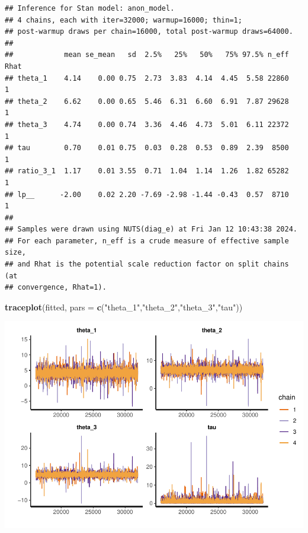 \documentclass[
]{article}
\newenvironment{Shaded}{\begin{snugshade}}{\end{snugshade}}
\newcommand{\AttributeTok}[1]{\textcolor[rgb]{0.13,0.29,0.53}{#1}}
\newcommand{\FunctionTok}[1]{\textcolor[rgb]{0.13,0.29,0.53}{\textbf{#1}}}
\newcommand{\NormalTok}[1]{#1}
\newcommand{\StringTok}[1]{\textcolor[rgb]{0.31,0.60,0.02}{#1}}
\begin{document}
\begin{verbatim}
## Inference for Stan model: anon_model.
## 4 chains, each with iter=32000; warmup=16000; thin=1; 
## post-warmup draws per chain=16000, total post-warmup draws=64000.
## 
##            mean se_mean   sd  2.5%   25%   50%   75% 97.5% n_eff Rhat
## theta_1    4.14    0.00 0.75  2.73  3.83  4.14  4.45  5.58 22860    1
## theta_2    6.62    0.00 0.65  5.46  6.31  6.60  6.91  7.87 29628    1
## theta_3    4.74    0.00 0.74  3.36  4.46  4.73  5.01  6.11 22372    1
## tau        0.70    0.01 0.75  0.03  0.28  0.53  0.89  2.39  8500    1
## ratio_3_1  1.17    0.01 3.55  0.71  1.04  1.14  1.26  1.82 65282    1
## lp__      -2.00    0.02 2.20 -7.69 -2.98 -1.44 -0.43  0.57  8710    1
## 
## Samples were drawn using NUTS(diag_e) at Fri Jan 12 10:43:38 2024.
## For each parameter, n_eff is a crude measure of effective sample size,
## and Rhat is the potential scale reduction factor on split chains (at 
## convergence, Rhat=1).
\end{verbatim}

\begin{Shaded}
\begin{Highlighting}[]
\FunctionTok{traceplot}\NormalTok{(fitted, }\AttributeTok{pars =} \FunctionTok{c}\NormalTok{(}\StringTok{"theta\_1"}\NormalTok{,}\StringTok{"theta\_2"}\NormalTok{,}\StringTok{"theta\_3"}\NormalTok{,}\StringTok{"tau"}\NormalTok{))}
\end{Highlighting}
\end{Shaded}

\includegraphics{for_markdown_files/figure-latex/unnamed-chunk-15-1.pdf}
\end{document}
